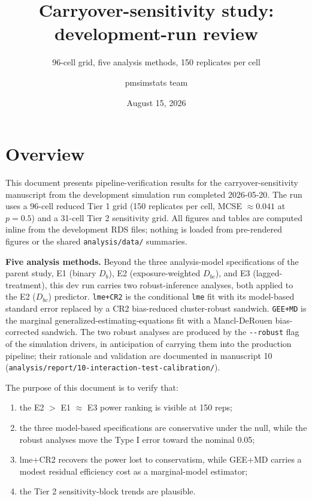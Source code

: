 \documentclass[
  11pt,
]{article}
\title{Carryover-sensitivity study: development-run review}
\subtitle{96-cell grid, five analysis methods, 150 replicates per cell}
\author{pmsimstats team}
\date{August 15, 2026}
\providecommand{\tightlist}{%
  \setlength{\itemsep}{0pt}\setlength{\parskip}{0pt}}
\begin{document}
\maketitle

{
\setcounter{tocdepth}{2}
\tableofcontents
}
\section{Overview}\label{overview}

This document presents pipeline-verification results for the
carryover-sensitivity manuscript from the development simulation
run completed 2026-05-20. The run uses a 96-cell reduced Tier 1
grid (150 replicates per cell, MCSE \(\approx 0.041\) at \(p = 0.5\))
and a 31-cell Tier 2 sensitivity grid. All figures and tables are
computed inline from the development RDS files; nothing is loaded
from pre-rendered figures or the shared \texttt{analysis/data/} summaries.

\textbf{Five analysis methods.} Beyond the three analysis-model
specifications of the parent study, E1 (binary \(D_b\)), E2
(exposure-weighted \(D_{bc}\)), and E3 (lagged-treatment), this dev
run carries two robust-inference analyses, both applied to the E2
(\(D_{bc}\)) predictor. \texttt{lme+CR2} is the conditional \texttt{lme} fit with
its model-based standard error replaced by a CR2 bias-reduced
cluster-robust sandwich. \texttt{GEE+MD} is the marginal
generalized-estimating-equations fit with a Mancl-DeRouen
bias-corrected sandwich. The two robust analyses are produced by
the \texttt{-\/-robust} flag of the simulation drivers, in anticipation of
carrying them into the production pipeline; their rationale and
validation are documented in manuscript 10
(\texttt{analysis/report/10-interaction-test-calibration/}).

The purpose of this document is to verify that:

\begin{enumerate}
\def\labelenumi{\alph{enumi})}
\tightlist
\item
  the E2 \(>\) E1 \(\approx\) E3 power ranking is visible at 150 reps;
\item
  the three model-based specifications are conservative under the
  null, while the robust analyses move the Type I error toward
  the nominal 0.05;
\item
  lme+CR2 recovers the power lost to conservatism, while GEE+MD
  carries a modest residual efficiency cost as a marginal-model
  estimator;
\item
  the Tier 2 sensitivity-block trends are plausible.
\end{enumerate}
\end{document}
